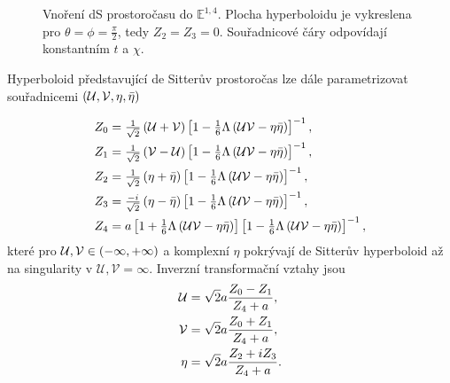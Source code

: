 \begin{figure}[H]
     \centering
     \caption{Vnoření dS prostoročasu do $\mathbb{E}^{1,4}$. Plocha hyperboloidu je vykreslena pro $\theta=\phi=\frac{\pi}{2}$, tedy $Z_2 = Z_3 = 0$. Souřadnicové čáry odpovídají konstantním $t$ a $\chi$.}
\end{figure}


Hyperboloid představující de Sitterův prostoročas lze dále parametrizovat souřadnicemi $(\mathcal{U}, \mathcal{V}, \eta, \bar{\eta})$

\begin{equation}
     \label{eq:5DToNullMetricTransformation}
     \begin{split}
          Z_0 &= \tfrac{1}{\sqrt{2}} \left(\mathcal{U} + \mathcal{V}\right) \left[1-\tfrac{1}{6} \Lambda \left(\mathcal{U} \mathcal{V} - \eta \bar{\eta}\right)\right]^{-1}, \\
          Z_1 &= \tfrac{1}{\sqrt{2}} \left(\mathcal{V} - \mathcal{U}\right) \left[1-\tfrac{1}{6} \Lambda \left(\mathcal{U} \mathcal{V} - \eta \bar{\eta}\right)\right]^{-1}, \\
          Z_2 &= \tfrac{1}{\sqrt{2}} \left(\eta + \bar{\eta}\right) \left[1-\tfrac{1}{6} \Lambda \left(\mathcal{U} \mathcal{V} - \eta \bar{\eta}\right)\right]^{-1}, \\
          Z_3 &= \tfrac{-i}{\sqrt{2}} \left(\eta - \bar{\eta}\right) \left[1-\tfrac{1}{6} \Lambda \left(\mathcal{U} \mathcal{V} - \eta \bar{\eta}\right)\right]^{-1}, \\
          Z_4 &= a \left[1 + \tfrac{1}{6} \Lambda \left(\mathcal{U} \mathcal{V} - \eta \bar{\eta}\right)\right] \left[1-\tfrac{1}{6} \Lambda \left(\mathcal{U} \mathcal{V} - \eta \bar{\eta}\right)\right]^{-1},
     \end{split}
\end{equation}
které pro $\mathcal{U}, \mathcal{V} \in \left(-\infty, +\infty\right)$ a komplexní $\eta$ pokrývají de Sitterův hyperboloid až na singularity v  $\mathcal{U}, \mathcal{V} = \infty$.
Inverzní transformační vztahy jsou
\begin{equation}
     \label{eq:NullConformalToD5Transformation}
     \begin{split}
          \mathcal{U} &= \sqrt{2} a \frac{Z_0 - Z_1}{Z_4 + a}, \\
          \mathcal{V} &= \sqrt{2} a \frac{Z_0 + Z_1}{Z_4 + a}, \\
          \eta &= \sqrt{2} a \frac{Z_2 + i Z_3}{Z_4 + a}.
     \end{split}
\end{equation}

